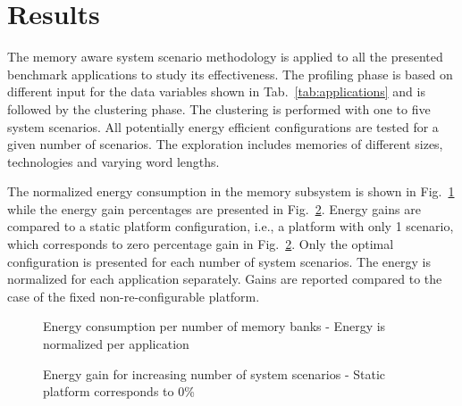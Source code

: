 \documentclass{acm_proc_article-sp}
\begin{document}
\section{Results}
\label{sec:results}

The memory aware system scenario methodology is applied to all the presented benchmark applications to study its effectiveness. The profiling phase is based on different input for the data variables shown in Tab.~\ref{tab:applications} and is followed by the clustering phase. The clustering is performed with one to five system scenarios. All potentially energy efficient configurations are tested for a given number of scenarios. The exploration includes memories of different sizes, technologies and varying word lengths. 

The normalized energy consumption in the memory subsystem is shown in Fig.~\ref{fig:energy} while the energy gain percentages are presented in Fig.~\ref{fig:gains}. Energy gains are compared to a static platform configuration, i.e., a platform with only 1 scenario, which corresponds to zero percentage gain in Fig.~\ref{fig:gains}. Only the optimal configuration is presented for each number of system scenarios. The energy is normalized for each application separately. Gains are reported compared to the case of the fixed non-re-configurable platform.

\begin{figure}[!t]
\centering
\caption{Energy consumption per number of memory banks - Energy is normalized per application}
\label{fig:energy}
\end{figure}

\begin{figure}[!t]
\centering
\caption{Energy gain for increasing number of system scenarios - Static platform corresponds to 0\%}
\label{fig:gains}
\end{figure}
\end{document}
